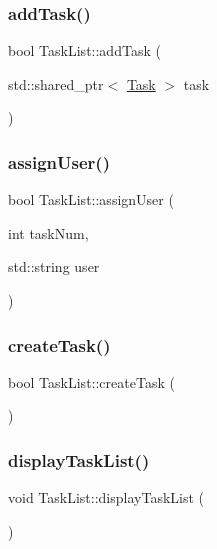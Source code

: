 \subsubsection{\texorpdfstring{add\+Task()}{addTask()}}
{\footnotesize\ttfamily bool Task\+List\+::add\+Task (\begin{DoxyParamCaption}\item[{std\+::shared\+\_\+ptr$<$ \mbox{\hyperlink{class_task}{Task}} $>$}]{task }\end{DoxyParamCaption})}

\mbox{\label{class_task_list_ad4cfe5e33b887bf958f5623eca545ddd}} 
\subsubsection{\texorpdfstring{assign\+User()}{assignUser()}}
{\footnotesize\ttfamily bool Task\+List\+::assign\+User (\begin{DoxyParamCaption}\item[{int}]{task\+Num,  }\item[{std\+::string}]{user }\end{DoxyParamCaption})}

\mbox{\label{class_task_list_a74c877894c2f92c796100b1e975858ad}} 
\subsubsection{\texorpdfstring{create\+Task()}{createTask()}}
{\footnotesize\ttfamily bool Task\+List\+::create\+Task (\begin{DoxyParamCaption}{ }\end{DoxyParamCaption})}

\mbox{\label{class_task_list_a234f082b802694c2e097bc42f74141df}} 
\subsubsection{\texorpdfstring{display\+Task\+List()}{displayTaskList()}}
{\footnotesize\ttfamily void Task\+List\+::display\+Task\+List (\begin{DoxyParamCaption}{ }\end{DoxyParamCaption})}

